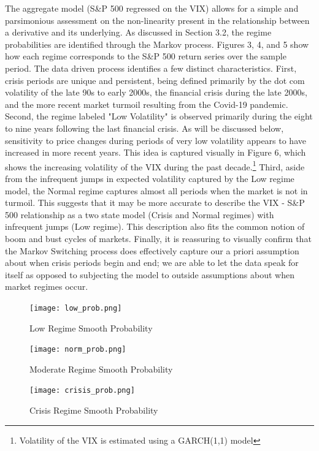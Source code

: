 \documentclass[11pt,a4paper,oldfontcommands]{memoir}
\begin{document}
{The aggregate model (S\&P 500 regressed on the VIX) allows for a simple and parsimonious assessment on the non-linearity present in the relationship between a derivative and its underlying. As discussed in Section 3.2, the regime probabilities are identified through the Markov process. Figures 3, 4, and 5 show how each regime corresponds to the S\&P 500 return series over the sample period. The data driven process identifies a few distinct characteristics. First, crisis periods are unique and persistent, being defined primarily by the dot com volatility of the late 90s to early 2000s, the financial crisis during the late 2000s, and the more recent market turmoil resulting from the Covid-19 pandemic. Second, the regime labeled "Low Volatility" is observed primarily during the eight to nine years following the last financial crisis. As will be discussed below, sensitivity to price changes during periods of very low volatility appears to have increased in more recent years. This idea is captured visually in Figure 6, which shows the increasing volatility of the VIX during the past decade.\footnote{Volatility of the VIX is estimated using a GARCH(1,1) model} Third, aside from the infrequent jumps in expected volatility captured by the Low regime model, the Normal regime captures almost all periods when the market is not in turmoil. This suggests that it may be more accurate to describe the VIX - S\&P 500 relationship as a two state model (Crisis and Normal regimes) with infrequent jumps (Low regime). This description also fits the common notion of boom and bust cycles of markets. Finally, it is reassuring to visually confirm that the Markov Switching process does effectively capture our a priori assumption about when crisis periods begin and end; we are able to let the data speak for itself as opposed to subjecting the model to outside assumptions about when market regimes occur. 

\begin{figure}[H]
\caption{Low Regime Smooth Probability}
\texttt{[image: low\_prob.png]} 
\centering
\label{}
\end{figure}

  

\begin{figure}[H]
\caption{Moderate Regime Smooth Probability}
\texttt{[image: norm\_prob.png]} 
\centering
\label{}
\end{figure}

  

\begin{figure}[H]
\caption{Crisis Regime Smooth Probability}
\texttt{[image: crisis\_prob.png]} 
\centering
\label{}
\end{figure}


}
\end{document}
